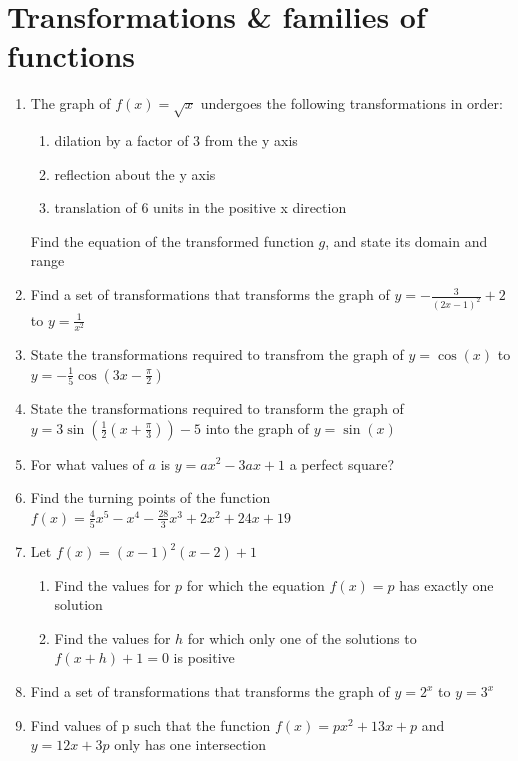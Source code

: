 \documentclass[12pt]{article}
\begin{document}
\section{Transformations \& families of functions}

\begin{enumerate}
    \item The graph of $f(x) = \sqrt{x}$ undergoes the following transformations in order:
    \begin{enumerate}[i]
        \item dilation by a factor of 3 from the y axis
        \item reflection about the y axis
        \item translation of 6 units in the positive x direction
    \end{enumerate}
    Find the equation of the transformed function $g$, and state its domain and range
    \item Find a set of transformations that transforms the graph of $y = -\frac{3}{(2x - 1)^{2}} + 2$ to $y = \frac{1}{x^{2}}$
    \item State the transformations required to transfrom the graph of $y = \cos(x)$ to $y = -\frac{1}{5}\cos(3x - \frac{\pi}{2})$
    \item State the transformations required to transform the graph of $y = 3 \sin(\frac{1}{2}(x + \frac{\pi}{3})) - 5$ into the graph of $y = \sin(x)$
    \item For what values of $a$ is $y = ax^{2} - 3 a x + 1$ a perfect square?
    \item Find the turning points of the function $f(x) = \frac{4}{5}x^{5} - x^{4} - \frac{28}{3}x^{3} + 2x^{2} + 24x + 19$
    \item Let $f(x) = (x-1)^{2}(x -2) + 1$
    \begin{enumerate}
        \item Find the values for $p$ for which the equation $f(x) = p$ has exactly one solution
        \item Find the values for $h$ for which only one of the solutions to $f(x + h) + 1 = 0$ is positive
    \end{enumerate}

    \item Find a set of transformations that transforms the graph of $y = 2^{x}$ to $y = 3^{x}$
    \item Find values of p such that the function $f(x) = px^2+13x+p$ and $y = 12 x + 3p$ only has one intersection
\end{enumerate}
\end{document}
